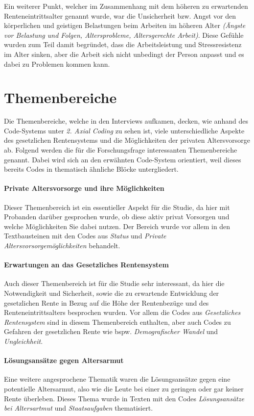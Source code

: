 \documentclass{hsflensburg}
\begin{document}
	Ein weiterer Punkt, welcher im Zusammenhang mit dem höheren zu erwartenden Renteneintrittsalter genannt wurde, war die
	Unsicherheit bzw. Angst vor den körperlichen und geistigen Belastungen beim Arbeiten im höheren Alter 
	\textit{(Ängste vor Belastung und Folgen, Altersprobleme, Altersgerechte Arbeit)}. Diese Gefühle wurden zum Teil
	damit begründet, dass die Arbeitsleistung und Stressresistenz im Alter sinken, aber die Arbeit sich nicht unbedingt
	der Person anpasst und es dabei zu Problemen kommen kann.

	\pagebreak

	\section{Themenbereiche}
	Die Themenbereiche, welche in den Interviews aufkamen, decken, wie anhand des  Code-Systems unter 
	\textit{2. Axial Coding} zu sehen ist, viele unterschiedliche Aspekte des gesetzlichen Rentensystems
	und die Möglichkeiten der privaten Altersvorsorge ab. Folgend werden die für die Forschungsfrage interessanten
	Themenbereiche genannt. Dabei wird sich an den erwähnten Code-System orientiert, weil dieses bereits
	Codes in thematisch ähnliche Blöcke untergliedert.

	\paragraph{Private Altersvorsorge und ihre Möglichkeiten}
	Dieser Themenbereich ist ein essentieller Aspekt für die Studie, da hier mit Probanden darüber gesprochen wurde,
	ob diese aktiv privat Vorsorgen und welche Möglichkeiten Sie dabei nutzen. Der Bereich wurde vor allem
	in den Textbausteinen mit den Codes aus \textit{Status} und \textit{Private Altersvorsorgemöglichkeiten} behandelt.
	
	\paragraph{Erwartungen an das Gesetzliches Rentensystem}
	Auch dieser Themenbereich ist für die Studie sehr interessant, da hier die Notwendigkeit und Sicherheit, sowie
	die zu erwartende Entwicklung der gesetzlichen Rente in Bezug auf die Höhe der Rentenbezüge und des
	Renteneintrittsalters besprochen wurden. 	Vor allem die Codes aus \textit{Gesetzliches Rentensystem}
	sind in diesem Themenbereich enthalten, aber auch Codes zu Gefahren der gesetzlichen Rente wie bspw.
	\textit{Demografischer Wandel} und \textit{Ungleichheit}.

	\paragraph{Lösungsansätze gegen Altersarmut}
	Eine weitere angesprochene Thematik waren die Lösungsansätze gegen eine potentielle Altersarmut, also
	wie die Leute bei einer zu geringen oder gar keiner Rente überleben. Dieses Thema wurde in Texten mit den Codes
	\textit{Lösungsansätze bei Altersartmut} und \textit{Staatsaufgaben} thematisiert.


	\clearpage
	\nocite{*}	
	
	
\end{document}
